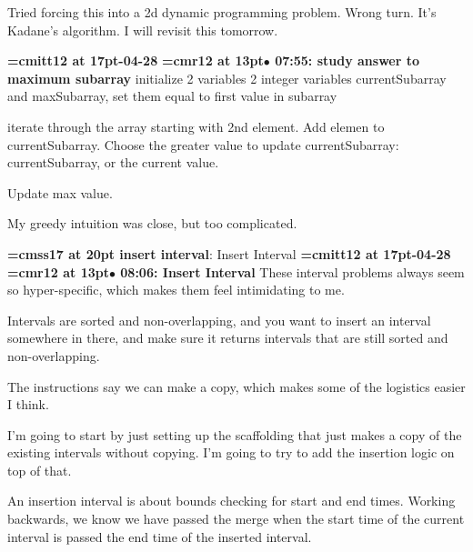 Tried forcing this into a 2d dynamic programming problem. Wrong turn. It's Kadane's algorithm. I will revisit this tomorrow.
\par

{\medskip\noindent\bf\font\titlefont=cmitt12 at 17pt-04-28}\medskip
{\smallskip\noindent\bf\font\titlefont=cmr12 at 13pt\titlefont $\bullet$ 07:55: study answer to maximum subarray}\smallskip
initialize 2 variables 2 integer variables currentSubarray and maxSubarray, set them equal to first value in subarray
\par

iterate through the array starting with 2nd element. Add elemen to currentSubarray. Choose the greater value to update currentSubarray: currentSubarray, or the current value.
\par

Update max value.
\par

My greedy intuition was close, but too complicated.
\par

{\medskip\noindent\bf\font\titlefont=cmss17 at 20pt insert interval}: Insert Interval
{\medskip\noindent\bf\font\titlefont=cmitt12 at 17pt-04-28}\medskip
{\smallskip\noindent\bf\font\titlefont=cmr12 at 13pt\titlefont $\bullet$ 08:06: Insert Interval}\smallskip
These interval problems always seem so hyper-specific, which makes them feel intimidating to me.
\par

Intervals are sorted and non-overlapping, and you want to insert an interval somewhere in there, and make sure it returns intervals that are still sorted and non-overlapping.
\par

The instructions say we can make a copy, which makes some of the logistics easier I think.
\par

I'm going to start by just setting up the scaffolding that just makes a copy of the existing intervals without copying. I'm going to try to add the insertion logic on top of that.
\par

An insertion interval is about bounds checking for start and end times. Working backwards, we know we have passed the merge when the start time of the current interval is passed the end time of the inserted interval.
\par

